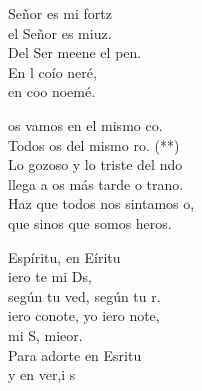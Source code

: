 \documentclass[12pt]{article}
\begin{document}
\begin{multicols*}{2}
\begin{cancion}%
	 Señor es mi fortz\\
	el Señor es miuz.\\
	Del Ser meene el pen. \\
	En l coío neré,\\
	en  coo noemé. \\
\end{cancion}%

\begin{cancion}%
	os vamos en el mismo co.\\
	Todos os del mismo ro. (**)\\
	Lo gozoso y lo triste del ndo\\
	llega a os más tarde o trano.\\
	Haz que todos nos sintamos o,\\
	que sinos que somos heros.\\
\end{cancion}%

\begin{cancion}%
	Espíritu, en Eíritu \\
	iero te mi Ds,\\
	según tu ved, según tu r.\\
	iero conote, yo iero note,\\
	mi S, mieor.\\
	Para adorte en Esritu \\
	y en ver,i s \\
\end{cancion}%


\end{multicols*}
\end{document}
